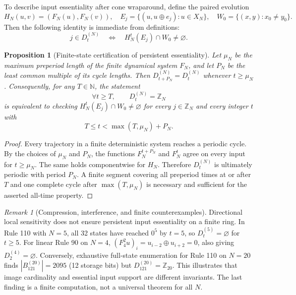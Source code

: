 \documentclass[11pt,a4paper]{article}
\newtheorem{proposition}[theorem]{Proposition}
\theoremstyle{definition}
\theoremstyle{remark}
\newtheorem{remark}[theorem]{Remark}
\newcommand{\Z}{\mathbb{Z}}
\newcommand{\N}{\mathbb{N}}
\newcommand{\xor}{\oplus}
\begin{document}
To describe input essentiality after cone wraparound, define the paired evolution
\[
 H_N(u,v)=(F_N(u),F_N(v)),\quad
 E_j=\{(u,u\xor e_j):u\in X_N\},\quad
 W_0=\{(x,y):x_0\ne y_0\}.
\]
Then the following identity is immediate from definitions:
\[
 j\in D_t^{(N)}\quad\Longleftrightarrow\quad H_N^t(E_j)\cap W_0\ne\varnothing.
\]
\begin{proposition}[Finite-state certification of persistent essentiality]\label{prop:finite}
Let $\mu_N$ be the maximum preperiod length of the finite dynamical system $F_N$, and let $P_N$ be the least common multiple of its cycle lengths. Then $D_{t+P_N}^{(N)}=D_t^{(N)}$ whenever $t\ge\mu_N$. Consequently, for any $T\in\N$, the statement
\[
 \forall t\ge T,\qquad D_t^{(N)}=\Z_N
\]
is equivalent to checking $H_N^t(E_j)\cap W_0\ne\varnothing$ for every $j\in\Z_N$ and every integer $t$ with
\[
 T\le t<\max(T,\mu_N)+P_N.
\]
\end{proposition}
\begin{proof}
Every trajectory in a finite deterministic system reaches a periodic cycle. By the choices of $\mu_N$ and $P_N$, the functions $F_N^{t+P_N}$ and $F_N^t$ agree on every input for $t\ge\mu_N$. The same holds componentwise for $H_N$. Therefore $D_t^{(N)}$ is ultimately periodic with period $P_N$. A finite segment covering all preperiod times at or after $T$ and one complete cycle after $\max(T,\mu_N)$ is necessary and sufficient for the asserted all-time property.
\end{proof}

\begin{remark}[Compression, interference, and finite counterexamples]
Directional local sensitivity does not ensure persistent input essentiality on a finite ring. In Rule 110 with $N=5$, all 32 states have reached $0^5$ by $t=5$, so $D_t^{(5)}=\varnothing$ for $t\ge5$. For linear Rule 90 on $N=4$, $(F_4^2u)_i=u_{i-2}\xor u_{i+2}=0$, also giving $D_2^{(4)}=\varnothing$. Conversely, exhaustive full-state enumeration for Rule 110 on $N=20$ finds $|B_{121}^{(20)}|=2095$ (12 storage bits) but $D_{121}^{(20)}=\Z_{20}$. This illustrates that image cardinality and essential input support are different invariants. The last finding is a finite computation, not a universal theorem for all $N$.
\end{remark}
\end{document}
